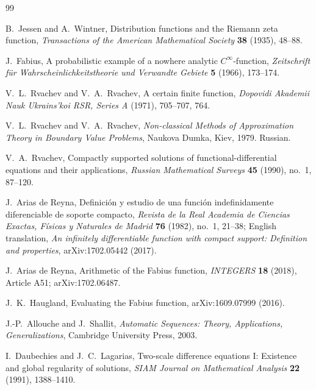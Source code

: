 \documentclass[11pt,oneside]{article}
\theoremstyle{definition}
\theoremstyle{remark}
\begin{document}
\begin{thebibliography}{99}

B.~Jessen and A.~Wintner,
\newblock Distribution functions and the Riemann zeta function,
\newblock \emph{Transactions of the American Mathematical Society} \textbf{38} (1935), 48--88.

J.~Fabius,
\newblock A probabilistic example of a nowhere analytic $C^\infty$-function,
\newblock \emph{Zeitschrift f\"ur Wahrscheinlichkeitstheorie und Verwandte Gebiete}
\textbf{5} (1966), 173--174.

V.~L.~Rvachev and V.~A.~Rvachev,
\newblock A certain finite function,
\newblock \emph{Dopovidi Akademii Nauk Ukrains'koi RSR, Series A} (1971), 705--707, 764.

V.~L.~Rvachev and V.~A.~Rvachev,
\newblock \emph{Non-classical Methods of Approximation Theory in Boundary Value Problems},
\newblock Naukova Dumka, Kiev, 1979.  Russian.

V.~A.~Rvachev,
\newblock Compactly supported solutions of functional-differential equations and their applications,
\newblock \emph{Russian Mathematical Surveys} \textbf{45} (1990), no.~1, 87--120.

J.~Arias de Reyna,
\newblock Definici\'on y estudio de una funci\'on indefinidamente diferenciable de soporte compacto,
\newblock \emph{Revista de la Real Academia de Ciencias Exactas, F\'isicas y Naturales de Madrid}
\textbf{76} (1982), no.~1, 21--38; English translation,
\emph{An infinitely differentiable function with compact support: Definition and properties},
arXiv:1702.05442 (2017).

J.~Arias de Reyna,
\newblock Arithmetic of the Fabius function,
\newblock \emph{INTEGERS} \textbf{18} (2018), Article A51; arXiv:1702.06487.

J.~K.~Haugland,
\newblock Evaluating the Fabius function,
\newblock arXiv:1609.07999 (2016).

J.-P.~Allouche and J.~Shallit,
\newblock \emph{Automatic Sequences: Theory, Applications, Generalizations},
\newblock Cambridge University Press, 2003.

I.~Daubechies and J.~C.~Lagarias,
\newblock Two-scale difference equations I: Existence and global regularity of solutions,
\newblock \emph{SIAM Journal on Mathematical Analysis} \textbf{22} (1991), 1388--1410.


\end{thebibliography}
\end{document}
